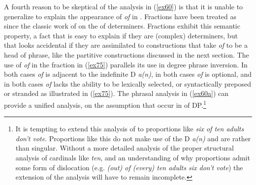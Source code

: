\documentclass[output=paper,
modfonts
]{LSP/langsci}
\begin{document}
A fourth reason to be skeptical of the analysis in ({\ref{ex60}}) is that it is unable to generalize to explain the appearance of {\textit{of}} in .  Fractions have been treated as  since the classic work of {\citet{Keenan86}} on the  of determiners.  Fractions exhibit this semantic property, a fact that is easy to explain if they are (complex) determiners, but that looks accidental if they are assimilated to constructions that take {\textit{of}} to be a head of phrase, like the partitive constructions discussed in the next section.  The use of {\textit{of}} in the fraction in ({\ref{ex75}}) parallels its use in degree phrase inversion.  In both cases {\textit{of}} is adjacent to the indefinite D {\textit{a(n)}}, in both cases {\textit{of}} is optional, and in both cases {\textit{of}} lacks the ability to be lexically selected, or syntactically preposed or stranded as illustrated in ({\ref{ex75}}).  The phrasal  analysis in ({\ref{ex60a}}) can provide a unified analysis, on the assumption that  occur in  of DP.{\footnote{It is tempting to extend this analysis of  to proportions like {\textit{six of ten adults don't vote}}.  Proportions like this do not make use of the D {\textit{a(n)}} and are  rather than singular.  Without a more detailed analysis of the proper structural analysis of cardinals like {\textit{ten}}, and an understanding of why proportions admit some form of dislocation (e.g. {\textit{(out) of (every) ten adults six don't vote}}) the extension of the analysis will have to remain incomplete.}}
\begin{exe}
\ex\label{ex75}
\begin{xlist}
\end{xlist}
\end{exe}
\end{document}
